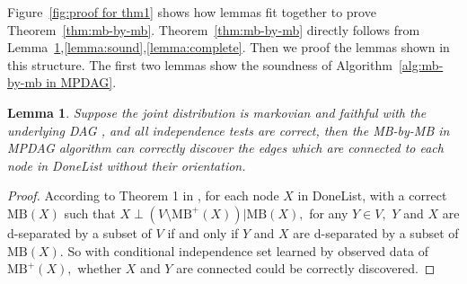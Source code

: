 \documentclass{article}
\newtheorem{lemma}{Lemma}
\begin{document}
Figure~\ref{fig:proof for thm1} shows how lemmas fit together to prove Theorem~\ref{thm:mb-by-mb}. Theorem~\ref{thm:mb-by-mb} directly follows from Lemma~\ref{lemma:adj},\ref{lemma:sound},\ref{lemma:complete}. Then we proof the lemmas shown in this structure. The first two lemmas show the soundness of Algorithm~\ref{alg:mb-by-mb in MPDAG}.

\begin{lemma}
\label{lemma:adj}
Suppose the joint distribution is markovian and faithful with the underlying DAG , and all independence tests are correct, then the MB-by-MB in MPDAG algorithm can correctly discover the edges which are connected to each node in DoneList without their orientation.
\end{lemma}
\begin{proof}
According to Theorem 1 in \citep{wang2014discovering}, for each node $X$ in DoneList, with a correct $\mathrm{MB}(X)$ such that $X \perp (V\setminus \mathrm{MB}^+(X))|\mathrm{MB}(X),$ for any $Y\in V,$ $Y$ and $X$ are d-separated by a subset of $V$ if and only if $Y$ and $X$ are d-separated by a subset of $\mathrm{MB}(X).$ So with conditional independence set learned by observed data of $\mathrm{MB}^+(X),$ whether $X$ and $Y$ are connected could be correctly discovered.
\end{proof}
\end{document}
